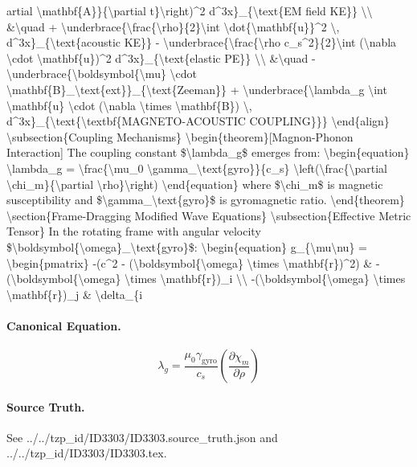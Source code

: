 artial \textbackslash{}mathbf\{A\}\}\{\textbackslash{}partial t\}\textbackslash{}right)\textasciicircum{}2 d\textasciicircum{}3x\}\_\{\textbackslash{}text\{EM field KE\}\} \textbackslash{}\textbackslash{} \&\textbackslash{}quad + \textbackslash{}underbrace\{\textbackslash{}frac\{\textbackslash{}rho\}\{2\}\textbackslash{}int \textbackslash{}dot\{\textbackslash{}mathbf\{u\}\}\textasciicircum{}2 \textbackslash{}, d\textasciicircum{}3x\}\_\{\textbackslash{}text\{acoustic KE\}\} - \textbackslash{}underbrace\{\textbackslash{}frac\{\textbackslash{}rho c\_s\textasciicircum{}2\}\{2\}\textbackslash{}int (\textbackslash{}nabla \textbackslash{}cdot \textbackslash{}mathbf\{u\})\textasciicircum{}2 d\textasciicircum{}3x\}\_\{\textbackslash{}text\{elastic PE\}\} \textbackslash{}\textbackslash{} \&\textbackslash{}quad - \textbackslash{}underbrace\{\textbackslash{}boldsymbol\{\textbackslash{}mu\} \textbackslash{}cdot \textbackslash{}mathbf\{B\}\_\textbackslash{}text\{ext\}\}\_\{\textbackslash{}text\{Zeeman\}\} + \textbackslash{}underbrace\{\textbackslash{}lambda\_g \textbackslash{}int \textbackslash{}mathbf\{u\} \textbackslash{}cdot (\textbackslash{}nabla \textbackslash{}times \textbackslash{}mathbf\{B\}) \textbackslash{}, d\textasciicircum{}3x\}\_\{\textbackslash{}text\{\textbackslash{}textbf\{MAGNETO-ACOUSTIC COUPLING\}\}\} \textbackslash{}end\{align\} \textbackslash{}subsection\{Coupling Mechanisms\} \textbackslash{}begin\{theorem\}[Magnon-Phonon Interaction] The coupling constant \$\textbackslash{}lambda\_g\$ emerges from: \textbackslash{}begin\{equation\} \textbackslash{}lambda\_g = \textbackslash{}frac\{\textbackslash{}mu\_0 \textbackslash{}gamma\_\textbackslash{}text\{gyro\}\}\{c\_s\} \textbackslash{}left(\textbackslash{}frac\{\textbackslash{}partial \textbackslash{}chi\_m\}\{\textbackslash{}partial \textbackslash{}rho\}\textbackslash{}right) \textbackslash{}end\{equation\} where \$\textbackslash{}chi\_m\$ is magnetic susceptibility and \$\textbackslash{}gamma\_\textbackslash{}text\{gyro\}\$ is gyromagnetic ratio. \textbackslash{}end\{theorem\} \textbackslash{}section\{Frame-Dragging Modified Wave Equations\} \textbackslash{}subsection\{Effective Metric Tensor\} In the rotating frame with angular velocity \$\textbackslash{}boldsymbol\{\textbackslash{}omega\}\_\textbackslash{}text\{gyro\}\$: \textbackslash{}begin\{equation\} g\_\{\textbackslash{}mu\textbackslash{}nu\} = \textbackslash{}begin\{pmatrix\} -(c\textasciicircum{}2 - (\textbackslash{}boldsymbol\{\textbackslash{}omega\} \textbackslash{}times \textbackslash{}mathbf\{r\})\textasciicircum{}2) \& -(\textbackslash{}boldsymbol\{\textbackslash{}omega\} \textbackslash{}times \textbackslash{}mathbf\{r\})\_i \textbackslash{}\textbackslash{} -(\textbackslash{}boldsymbol\{\textbackslash{}omega\} \textbackslash{}times \textbackslash{}mathbf\{r\})\_j \& \textbackslash{}delta\_\{i

\paragraph{Canonical Equation.}
\[
\begin{equation} \lambda_g = \frac{ \mu_0 \gamma_ \text{gyro}}{c_s} \left( \frac{ \partial \chi_m}{ \partial \rho} \right) \end{equation}
\]

\paragraph{Source Truth.}
See ../../tzp\_id/ID3303/ID3303.source\_truth.json and ../../tzp\_id/ID3303/ID3303.tex.
